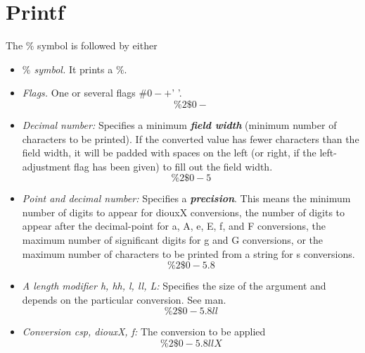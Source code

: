\documentclass[12pt]{article}
\begin{document}
\section{Printf}
The $\%$ symbol is followed by either 
\begin{itemize}
\item \textit{$\%$ symbol.} It prints a $\%$.
\item \textit{Flags.} One or several flags $\#0-+$' '.
\[ \%2\$0-\]
\item \textit{Decimal number:} Specifies a minimum \textbf{\textit{field width}} (minimum number of characters to be printed). If the converted value has fewer characters than the field width, it will be padded with spaces on the left (or right, if the left-adjustment flag has been given) to fill out the field width.
\[ \%2\$0-5\]
\item \textit{Point and decimal number:} Specifies a \textbf{\textit{precision}}. This means the minimum number of digits to appear for diouxX conversions,  the number of digits to appear after the decimal-point for a, A, e, E, f,  and F conversions, the maximum number of significant digits for g and G conversions, or the maximum number of characters to be printed from a string for s conversions.
\[ \%2\$0-5.8\]
\item \textit{A length modifier h, hh, l, ll, L:} Specifies the size of the argument and depends on the particular conversion. See man. 
\[ \%2\$0-5.8ll\]
\item \textit{Conversion csp, diouxX,  f:} The conversion to be applied
\[ \%2\$0-5.8llX\]
\end{itemize}
\end{document}
